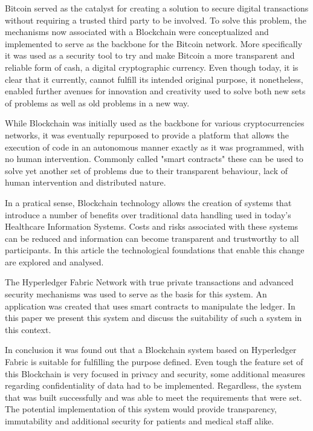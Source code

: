 \begin{tueABSTRACT}

  Bitcoin served as the catalyst for creating a solution to secure digital
  transactions without requiring a trusted third party to be involved. To solve
  this problem, the mechanisms now associated with a Blockchain were
  conceptualized and implemented to serve as the backbone for the Bitcoin
  network. More specifically it was used as a security tool to try and make
  Bitcoin a more transparent and reliable form of cash, a digital cryptographic
  currency.  Even though today, it is clear that it currently, cannot fulfill
  its intended original purpose, it nonetheless, enabled further avenues for
  innovation and creativity used to solve both new sets of problems as well as
  old problems in a new way.

  While Blockchain was initially used as the backbone for various
  cryptocurrencies networks, it was eventually repurposed to provide a platform
  that allows the execution of code in an autonomous manner exactly as it was
  programmed, with no human intervention. Commonly called "smart contracts"
  these can be used to solve yet another set of problems due to their
  transparent behaviour, lack of human intervention and distributed nature. 

  In a pratical sense, Blockchain technology allows the creation of systems
  that introduce a number of benefits over traditional data handling used in
  today's Healthcare Information Systems. Costs and risks associated with these
  systems can be reduced and information can become transparent and trustworthy
  to all participants. In this article the technological foundations that
  enable this change are explored and analysed. 
  
  The Hyperledger Fabric Network with true private transactions and advanced
  security mechanisms was used to serve as the basis for this system. An
  application was created that uses smart contracts to manipulate the ledger.
  In this paper we present this system and discuss the suitability of such a
  system in this context.
  
  In conclusion it was found out that a Blockchain system based on Hyperledger
  Fabric is suitable for fulfilling the purpose defined. Even tough the feature
  set of this Blockchain is very focused in privacy and security, some
  additional measures regarding confidentiality of data had to be implemented.
  Regardless, the system that was built successfully and was able to meet the
  requirements that were set. The potential implementation of this system would
  provide transparency, immutability and additional security for patients and
  medical staff alike. 

\end{tueABSTRACT}
